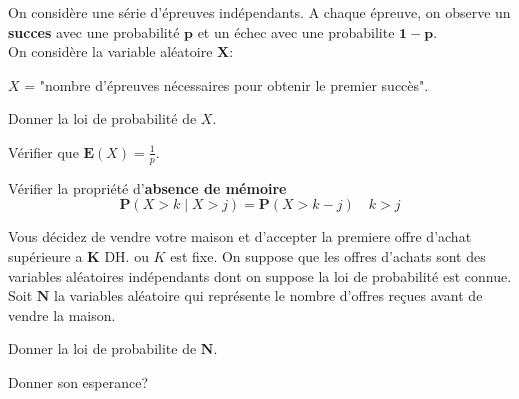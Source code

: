 \documentclass[11pt,largemargins]{homework}
\begin{document}

On considère une série d'épreuves indépendants. A chaque  épreuve, on observe un
\textbf{succes} avec une probabilité $\mathbf{p}$ et un échec avec une probabilite
$\mathbf{1-p}$.\\

On considère la variable aléatoire $\mathbf{X}$:

$X$ = "nombre d'épreuves nécessaires pour obtenir le premier succès".\\

\begin{arabicparts}
    \item Donner la loi de probabilité de $X$.
    \item Vérifier que $\mathbf{E}(X) = \frac{1}{p}$.
    \item Vérifier la propriété d'\textbf{absence de mémoire}
      $$
      \mathbf{P}(X > k\;|\; X > j) = \mathbf{P}(X >  k-j )\quad k > j
      $$
    \item Vous décidez de vendre votre maison et d'accepter  la premiere offre
      d'achat supérieure a $\mathbf{K}$ DH. ou $K$ est fixe. On suppose que les
      offres d'achats sont des variables aléatoires indépendants dont on suppose
      la loi de probabilité est connue.\\

      Soit $\mathbf{N}$ la variables aléatoire qui représente le nombre
      d'offres reçues avant de vendre la maison.

      \begin{arabicparts}
      \item Donner la loi de probabilite de $\mathbf{N}$.
      \item Donner son esperance?
      \end{arabicparts}
\end{arabicparts}
\end{document}
